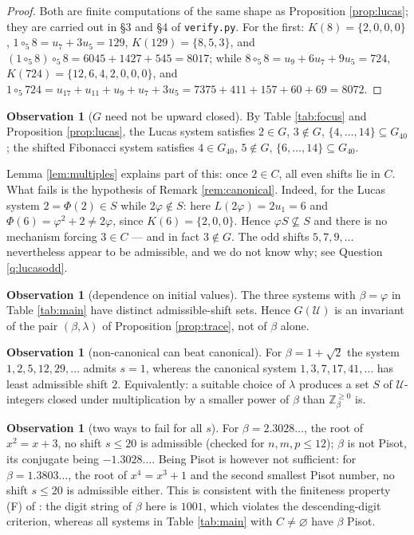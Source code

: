 \documentclass[11pt,reqno]{amsart}
\theoremstyle{plain}
\theoremstyle{definition}
\newtheorem{observation}[theorem]{Observation}
\newcommand{\Z}{\mathbb{Z}}
\newcommand{\Uu}{\mathcal{U}}
\begin{document}
\begin{proof}
Both are finite computations of the same shape as Proposition \ref{prop:lucas}; they are carried out
in \S3 and \S4 of \texttt{verify.py}. For the first: $K(8)=\{2,0,0,0\}$, $1\circ_{5}8=u_{7}+3u_{5}=129$,
$K(129)=\{8,5,3\}$, and $(1\circ_{5}8)\circ_{5}8=6045+1427+545=8017$; while
$8\circ_{5}8=u_{9}+6u_{7}+9u_{5}=724$, $K(724)=\{12,6,4,2,0,0,0\}$, and
$1\circ_{5}724=u_{17}+u_{11}+u_{9}+u_{7}+3u_{5}=7375+411+157+60+69=8072$.
\end{proof}

\begin{observation}[$G$ need not be upward closed]\label{obs:notupset}
By Table \ref{tab:focus} and Proposition \ref{prop:lucas}, the Lucas system satisfies
$2\in G$, $3\notin G$, $\{4,\dots,14\}\subseteq G_{40}$; the shifted Fibonacci system satisfies
$4\in G_{40}$, $5\notin G$, $\{6,\dots,14\}\subseteq G_{40}$.
\end{observation}

Lemma \ref{lem:multiples} explains part of this: once $2\in C$, all even shifts lie in $C$. What
fails is the hypothesis of Remark \ref{rem:canonical}. Indeed, for the Lucas system
$2=\Phi(2)\in S$ while $2\varphi\notin S$: here $L(2\varphi)=2u_{1}=6$ and
$\Phi(6)=\varphi^{2}+2\ne2\varphi$, since $K(6)=\{2,0,0\}$. Hence $\varphi S\not\subseteq S$ and
there is no mechanism forcing $3\in C$ --- and in fact $3\notin G$. The odd shifts $5,7,9,\dots$
nevertheless appear to be admissible, and we do not know why; see Question \ref{q:lucasodd}.

\begin{observation}[dependence on initial values]\label{obs:initial}
The three systems with $\beta=\varphi$ in Table \ref{tab:main} have distinct admissible-shift sets.
Hence $G(\Uu)$ is an invariant of the pair $(\beta,\lambda)$ of Proposition \ref{prop:trace}, not of
$\beta$ alone.
\end{observation}

\begin{observation}[non-canonical can beat canonical]\label{obs:beat}
For $\beta=1+\sqrt2$ the system $1,2,5,12,29,\dots$ admits $s=1$, whereas the canonical system
$1,3,7,17,41,\dots$ has least admissible shift $2$. Equivalently: a suitable choice of $\lambda$
produces a set $S$ of $\Uu$-integers closed under multiplication by a smaller power of $\beta$ than
$\Z_{\beta}^{\ge0}$ is.
\end{observation}

\begin{observation}[two ways to fail for all $s$]\label{obs:fail}
For $\beta=2.3028\dots$, the root of $x^{2}=x+3$, no shift $s\le20$ is admissible (checked for
$n,m,p\le12$); $\beta$ is not Pisot, its conjugate being $-1.3028\dots$. Being Pisot is however not
sufficient: for $\beta=1.3803\dots$, the root of $x^{4}=x^{3}+1$ and the second smallest Pisot
number, no shift $s\le20$ is admissible either. This is consistent with the finiteness property
(F) of \cite{FrougnySolomyak}: the digit string of $\beta$ here is $1001$, which violates the
descending-digit criterion, whereas all systems in Table \ref{tab:main} with $C\ne\varnothing$ have
$\beta$ Pisot.
\end{observation}
\end{document}
